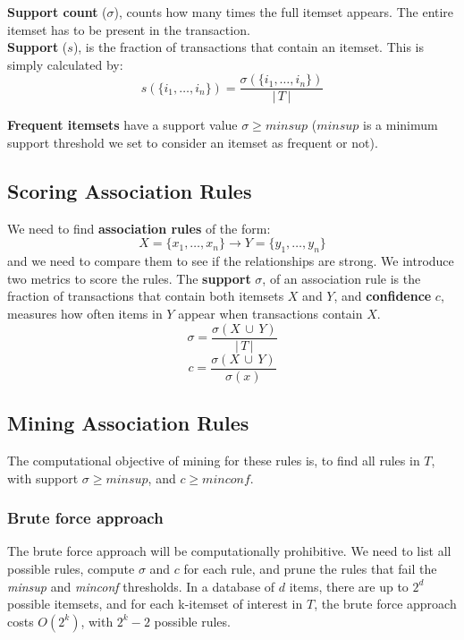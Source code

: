 \documentclass[9pt,twocolumn]{article}
\begin{document}
\textbf{Support count} ($\sigma$), counts how many times the full itemset appears. The entire itemset has to be present in the transaction.\\

\textbf{Support} ($s$), is the fraction of transactions that contain an itemset. This is simply calculated by:
\begin{equation}
	s(\{i_1, \ldots, i_n\}) = \frac{\sigma(\{i_1, \ldots, i_n\})}{|\,T\,|}
\end{equation}

\textbf{Frequent itemsets} have a support value $\sigma \geq minsup$ ($minsup$ is a minimum support threshold we set to consider an itemset as frequent or not).

\subsection*{Scoring Association Rules}
We need to find \textbf{association rules} of the form:
\begin{equation}
	X=\{x_1, \ldots, x_n\} \rightarrow Y=\{y_1, \ldots, y_n\}
\end{equation}and we need to compare them to see if the relationships are strong. We introduce two metrics to score the rules. The \textbf{support} $\sigma$, of an association rule is the fraction of transactions that contain both itemsets $X$ and $Y$, and \textbf{confidence} $c$, measures how often items in $Y$ appear when transactions contain $X$.
\begin{equation}
	\sigma = \frac{\sigma(X\,\cup\,Y)}{|\,T\,|}
\end{equation}
\begin{equation}
	c = \frac{\sigma(X\,\cup\,Y)}{\sigma(x)}
\end{equation}

\subsection*{Mining Association Rules}
The computational objective of mining for these rules is, to find all rules in $T$, with support $\sigma \geq minsup$, and $c \geq minconf$.

\subsubsection*{Brute force approach}
The brute force approach will be computationally prohibitive. We need to list all possible rules, compute $\sigma$ and $c$ for each rule, and prune the rules that fail the \textit{minsup} and \textit{minconf} thresholds. In a database of $d$ items, there are up to $2^d$ possible itemsets, and for each k-itemset of interest in $T$, the brute force approach costs $O(2^k)$, with $2^k - 2$ possible rules.
\end{document}
